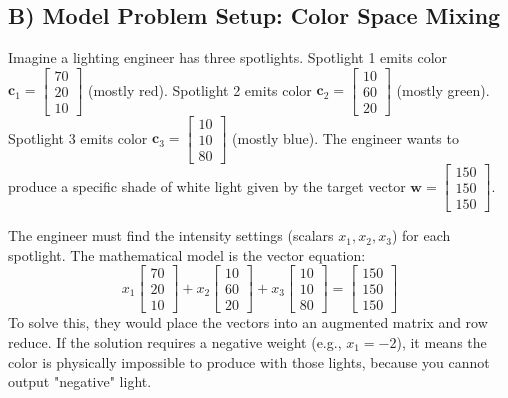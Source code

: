 \documentclass[11pt]{article}
\begin{document}
\subsection{B) Model Problem Setup: Color Space Mixing}
Imagine a lighting engineer has three spotlights. 
Spotlight 1 emits color $\mathbf{c}_1 = \begin{bmatrix} 70 \\ 20 \\ 10 \end{bmatrix}$ (mostly red).
Spotlight 2 emits color $\mathbf{c}_2 = \begin{bmatrix} 10 \\ 60 \\ 20 \end{bmatrix}$ (mostly green).
Spotlight 3 emits color $\mathbf{c}_3 = \begin{bmatrix} 10 \\ 10 \\ 80 \end{bmatrix}$ (mostly blue).
The engineer wants to produce a specific shade of white light given by the target vector $\mathbf{w} = \begin{bmatrix} 150 \\ 150 \\ 150 \end{bmatrix}$.

The engineer must find the intensity settings (scalars $x_1, x_2, x_3$) for each spotlight.
The mathematical model is the vector equation:
\[ x_1 \begin{bmatrix} 70 \\ 20 \\ 10 \end{bmatrix} + x_2 \begin{bmatrix} 10 \\ 60 \\ 20 \end{bmatrix} + x_3 \begin{bmatrix} 10 \\ 10 \\ 80 \end{bmatrix} = \begin{bmatrix} 150 \\ 150 \\ 150 \end{bmatrix} \]
To solve this, they would place the vectors into an augmented matrix and row reduce. If the solution requires a negative weight (e.g., $x_1 = -2$), it means the color is physically impossible to produce with those lights, because you cannot output "negative" light.
\end{document}
